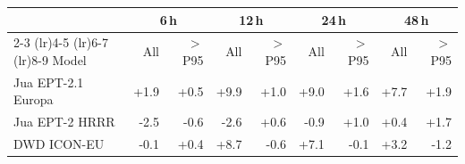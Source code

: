 \begin{tabular}{@{}l*{8}{r}@{}}
\toprule
& \multicolumn{2}{c}{6\,h} & \multicolumn{2}{c}{12\,h} & \multicolumn{2}{c}{24\,h} & \multicolumn{2}{c}{48\,h} \\
\cmidrule(lr){2-3} \cmidrule(lr){4-5} \cmidrule(lr){6-7} \cmidrule(lr){8-9}
Model & All & $>$P95 & All & $>$P95 & All & $>$P95 & All & $>$P95 \\
\midrule
Jua EPT-2.1 Europa & +1.9 & +0.5 & +9.9 & +1.0 & +9.0 & +1.6 & +7.7 & +1.9 \\
Jua EPT-2 HRRR & -2.5 & -0.6 & -2.6 & +0.6 & -0.9 & +1.0 & +0.4 & +1.7 \\
DWD ICON-EU & -0.1 & +0.4 & +8.7 & -0.6 & +7.1 & -0.1 & +3.2 & -1.2 \\
\bottomrule
\end{tabular}
